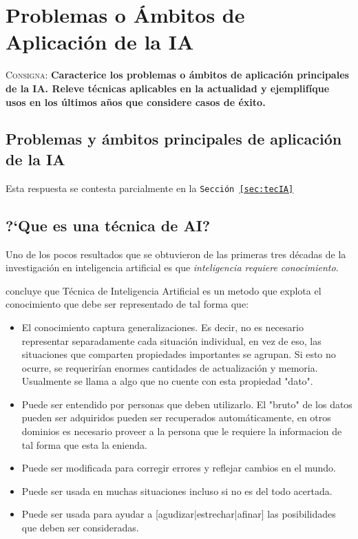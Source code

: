 \documentclass{article}
\begin{document}
\section{Problemas o \'Ambitos de Aplicaci\'on de la IA}
\label{sec:problemasia}
\textsc{Consigna}: \textbf{Caracterice los problemas o \'ambitos de aplicaci\'on principales de la IA. Releve t\'ecnicas aplicables en la actualidad y ejemplif\'ique usos en los \'ultimos a\~nos que considere casos de \'exito.}\\

\subsection{Problemas y \'ambitos principales de aplicaci\'on de la IA}
Esta respuesta se contesta parcialmente en la \texttt{Secci\'on \ref{sec:tecIA}}\\

\subsection{?`Que es una t\'ecnica de AI?}

Uno de los pocos resultados que se obtuvieron de las primeras tres d\'ecadas de la investigaci\'on en inteligencia artificial es que \textit{inteligencia requiere conocimiento}.

\cite{rich2009} concluye que T\'ecnica de Inteligencia Artificial es un metodo que explota el conocimiento que debe ser representado de tal forma que:
\begin{itemize}
\item El conocimiento captura generalizaciones. Es decir, no es necesario representar separadamente cada situaci\'on individual, en vez de eso, las situaciones que comparten propiedades importantes se agrupan. Si esto no ocurre, se requerir\'ian enormes cantidades de actualizaci\'on y memoria. Usualmente se llama a algo que no cuente con esta propiedad "dato".
\item Puede ser entendido por personas que deben utilizarlo. El "bruto" de los datos pueden ser adquiridos pueden ser recuperados autom\'aticamente, en otros dominios es necesario proveer a la persona que le requiere la informacion de tal forma que esta la enienda.
\item Puede ser modificada para corregir errores y reflejar cambios en el mundo.
\item Puede ser usada en muchas situaciones incluso si no es del todo acertada.
\item Puede ser usada para ayudar a [agudizar|estrechar|afinar] las posibilidades que deben ser consideradas.
\end{itemize}
\end{document}
